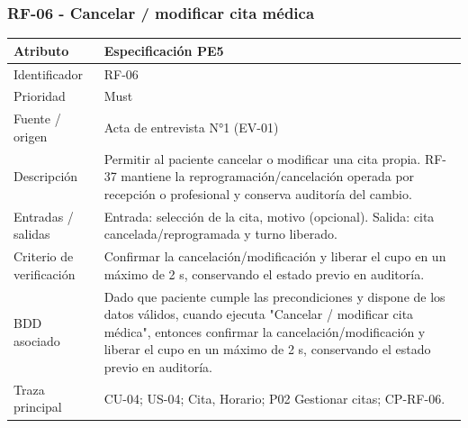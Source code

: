 \documentclass[11pt,a4paper]{article}
\begin{document}
	\subsubsection{RF-06 - Cancelar / modificar cita médica}
	\begin{tabularx}{\textwidth}{p{3.2cm}Y}
		\toprule
		\textbf{Atributo} & \textbf{Especificación PE5}\\\midrule
		Identificador & RF-06\\
		Prioridad & Must\\
		Fuente / origen & Acta de entrevista N°1 (EV-01)\\
		Descripción & Permitir al paciente cancelar o modificar una cita propia. RF-37 mantiene la reprogramación/cancelación operada por recepción o profesional y conserva auditoría del cambio.\\
		Entradas / salidas & Entrada: selección de la cita, motivo (opcional). Salida: cita cancelada/reprogramada y turno liberado.\\
		Criterio de verificación & Confirmar la cancelación/modificación y liberar el cupo en un máximo de 2 s, conservando el estado previo en auditoría.\\
		BDD asociado & Dado que paciente cumple las precondiciones y dispone de los datos válidos, cuando ejecuta "Cancelar / modificar cita médica", entonces confirmar la cancelación/modificación y liberar el cupo en un máximo de 2 s, conservando el estado previo en auditoría.\\
		Traza principal & CU-04; US-04; Cita, Horario; P02 Gestionar citas; CP-RF-06.\\
		\bottomrule
	\end{tabularx}
	\clearpage
\end{document}
